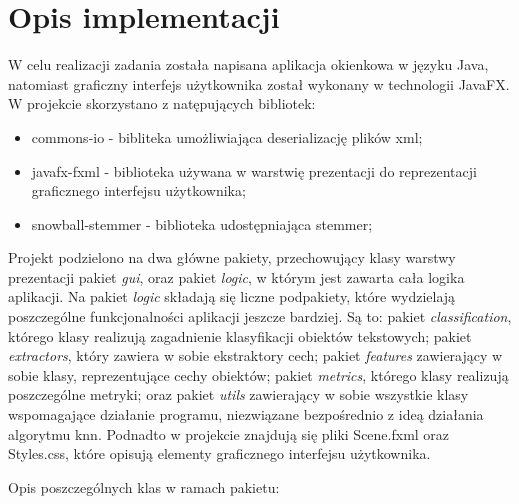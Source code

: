 \documentclass{classrep}
\begin{document}
\section{Opis implementacji}

W celu realizacji zadania została napisana aplikacja okienkowa w języku Java, natomiast graficzny interfejs użytkownika został wykonany w technologii JavaFX.
W projekcie skorzystano z natępujących bibliotek:
\begin{itemize}
	\item commons-io - bibliteka umożliwiająca deserializację plików xml; \cite{commons-io}
	\item javafx-fxml - biblioteka używana w warstwię prezentacji do reprezentacji graficznego interfejsu użytkownika; \cite{JavaFX}
	\item snowball-stemmer - biblioteka udostępniająca stemmer; \cite{Stemmer}
\end{itemize}

Projekt podzielono na dwa główne pakiety, przechowujący klasy warstwy prezentacji pakiet \textit{gui}, oraz pakiet \textit{logic}, w którym jest zawarta cała logika aplikacji. Na pakiet \textit{logic} składają się liczne podpakiety, które wydzielają poszczególne funkcjonalności aplikacji jeszcze bardziej. Są to: pakiet \textit{classification}, którego klasy realizują zagadnienie klasyfikacji obiektów tekstowych; pakiet \textit{extractors}, który zawiera w sobie ekstraktory cech; pakiet \textit{features} zawierający w sobie klasy, reprezentujące cechy obiektów; pakiet \textit{metrics}, którego klasy realizują poszczególne metryki; oraz pakiet \textit{utils} zawierający w sobie wszystkie klasy wspomagające działanie programu, niezwiązane bezpośrednio z ideą działania algorytmu knn. Podnadto w projekcie znajdują się pliki Scene.fxml oraz Styles.css, które opisują elementy graficznego interfejsu użytkownika.

Opis poszczególnych klas w ramach pakietu:
\end{document}
